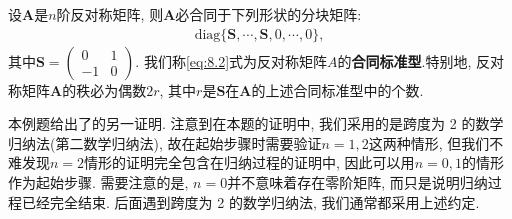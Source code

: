 \documentclass[../../main.tex]{subfiles}
\begin{document}
\begin{theorem}[反对称矩阵的合同标准型]\label{theorem:反对称矩阵的合同标准型}
设$\boldsymbol{A}$是$n$阶反对称矩阵, 则$\boldsymbol{A}$必合同于下列形状的分块矩阵:
\begin{align}
\text{diag}\{\boldsymbol{S}, \cdots, \boldsymbol{S}, 0, \cdots, 0\}, \label{eq:8.2}
\end{align}
其中$\boldsymbol{S}=\begin{pmatrix}
0 & 1 \\
-1 & 0
\end{pmatrix}$. 我们称\eqref{eq:8.2}式为反对称矩阵$A$的\textbf{合同标准型}.特别地, 反对称矩阵$\boldsymbol{A}$的秩必为偶数$2r$, 其中$r$是$\boldsymbol{S}$在$\boldsymbol{A}$的上述合同标准型中的个数.
\end{theorem}
\begin{remark}
本例题给出了的另一证明. 注意到在本题的证明中, 我们采用的是跨度为 2 的数学归纳法(第二数学归纳法), 故在起始步骤时需要验证$n = 1, 2$这两种情形, 但我们不难发现$n = 2$情形的证明完全包含在归纳过程的证明中, 因此可以用$n = 0, 1$的情形作为起始步骤. 需要注意的是, $n = 0$并不意味着存在零阶矩阵, 而只是说明归纳过程已经完全结束. 后面遇到跨度为 2 的数学归纳法, 我们通常都采用上述约定. 
\end{remark}
\end{document}
